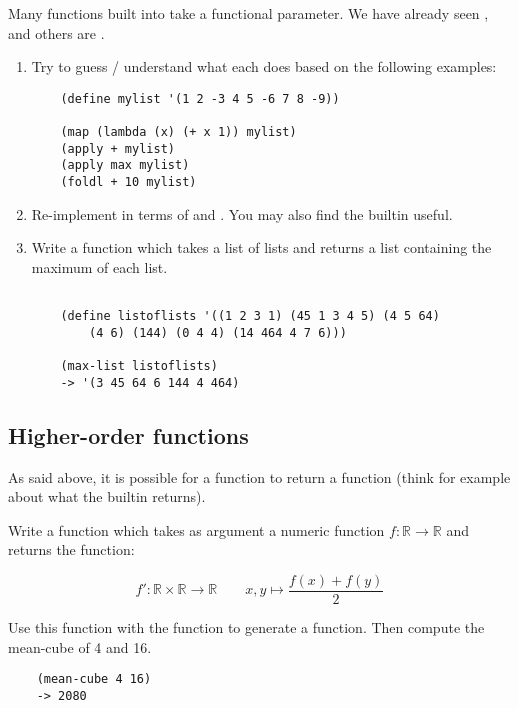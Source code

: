\documentclass{../../../tp}
\begin{document}
\begin{instruction}
	Many functions built into \scheme take a functional parameter. We have already seen , and others are . 
	\begin{enumerate}
		\item 	Try to guess / understand what each does based on the following examples:
	
	\begin{verbatim}
	(define mylist '(1 2 -3 4 5 -6 7 8 -9))
	
	(map (lambda (x) (+ x 1)) mylist)
	(apply + mylist)
	(apply max mylist)
	(foldl + 10 mylist)
	\end{verbatim}

	\item Re-implement   in terms of  and  . You may also find the  builtin useful.

	\item Write a function which takes a list of lists and returns a list containing the maximum of each list.
	\begin{verbatim}
	
	(define listoflists '((1 2 3 1) (45 1 3 4 5) (4 5 64) 
		(4 6) (144) (0 4 4) (14 464 4 7 6)))
	
	(max-list listoflists)
	-> '(3 45 64 6 144 4 464)
	\end{verbatim}
	\end{enumerate}
\end{instruction}

	
\subsection{Higher-order functions}

As said above, it is possible for a function to return a function (think for example about what the  builtin returns). 

\begin{instruction}
	Write a function  which takes as argument a numeric function $f: \mathbb{R} \rightarrow \mathbb{R}$ and returns the function: 
	
	$$ f': \mathbb{R} \times \mathbb{R} \rightarrow \mathbb{R} \qquad  x,y  \mapsto  \frac{f(x) + f(y)}{2}$$
	
	
	Use this function with the  function to generate a  function. Then compute the mean-cube of 4 and 16.
	
	\begin{verbatim}
	(mean-cube 4 16)
	-> 2080
	\end{verbatim}
	
\end{instruction}
\end{document}
